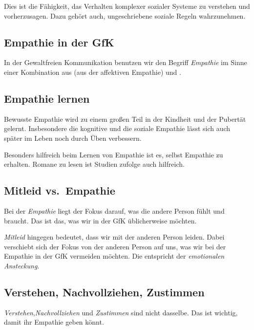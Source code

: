 Dies ist die Fähigkeit, das Verhalten komplexer sozialer Systeme zu verstehen und vorherzusagen. Dazu gehört auch, ungeschriebene soziale Regeln wahrzunehmen.


\subsection{Empathie in der GfK}

In der Gewaltfreien Kommunikation benutzen wir den Begriff \emph{Empathie} im Sinne einer Kombination aus  (aus der affektiven Empathie) und .


\subsection{Empathie lernen}

Bewusste Empathie wird zu einem großen Teil in der Kindheit und der Pubertät gelernt. Insbesondere die kognitive und die soziale Empathie lässt sich auch später im Leben noch durch Üben verbessern.

Besonders hilfreich beim Lernen von Empathie ist es, selbst Empathie zu erhalten. Romane zu lesen ist Studien zufolge auch hilfreich.


\subsection{Mitleid vs.~Empathie}
\label{mitleid}

Bei der \emph{Empathie} liegt der Fokus darauf, was die andere Person fühlt und braucht. Das ist das, was wir in der GfK üblicherweise möchten.

\emph{Mitleid} hingegen bedeutet, dass wir mit der anderen Person leiden. Dabei verschiebt sich der Fokus von der anderen Person auf uns, was wir bei der Empathie in der GfK vermeiden möchten. Die entspricht der \emph{emotionalen Ansteckung}.


\subsection{Verstehen, Nachvollziehen, Zustimmen}

\emph{Verstehen},\emph{Nachvollziehen} und \emph{Zustimmen} sind nicht dasselbe. Das ist wichtig, damit ihr Empathie geben könnt.

